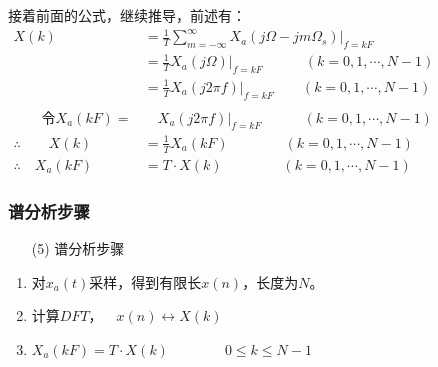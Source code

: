 \documentclass[notheorems,compress,mathserif,table]{beamer}
\newtheorem{zhuyi}{注意}
\begin{document}
\begin{frame}[shrink]\frametitle{}%
接着前面的公式，继续推导，前述有：
\begin{equation*}
\begin{split}
X(k) \quad  &=  \frac{1}{T}\sum_{m=-\infty}^{\infty}X_a\left(j\Omega-j m\Omega_s\right)\Big|_{ f  = k F  }  \qquad\qquad\qquad\qquad\qquad\qquad\qquad\qquad \\
			&=  \frac{1}{T} X_a\left(j\Omega\right)\Big|_{ f  = k F  }     \qquad\quad  (k = 0,1,\cdots ,N-1)  \\
			&=  \frac{1}{T} X_a\left(j 2\pi f\right)\Big|_{ f  = k F  }     \qquad ( k = 0,1,\cdots ,N-1)\\
	\quad   &\quad   \quad  \\
\qquad\mbox{令}X_a(kF) =
			&\quad   X_a\left(j 2\pi f\right)\big|_{ f  = k F  }  \qquad\quad (k = 0,1,\cdots ,N-1) \\
\therefore\qquad X(k)     
			&=  \frac{1}{T} X_a(kF)    \qquad\qquad (k = 0,1,\cdots ,N-1)\\
\therefore\quad X_a(kF)   
			&= T\cdot X(k)             \;\qquad\qquad (k = 0,1,\cdots ,N-1)
\end{split}
\end{equation*}
\end{frame}



\begin{frame}[shrink]\frametitle{谱分析步骤}%

\begin{enumerate}
	\item [(5)] 谱分析步骤
\end{enumerate}  

\begin{enumerate}
	\item 对$x_a(t)$采样，得到有限长$x(n)$，长度为$N$。
    \item 计算$DFT$，$\quad x(n)\longleftrightarrow X(k)$
    \item $X_a(kF)   = T\cdot X(k)   \qquad\qquad 0\leq k \leq N-1$
\end{enumerate}

\end{frame}
\end{document}
